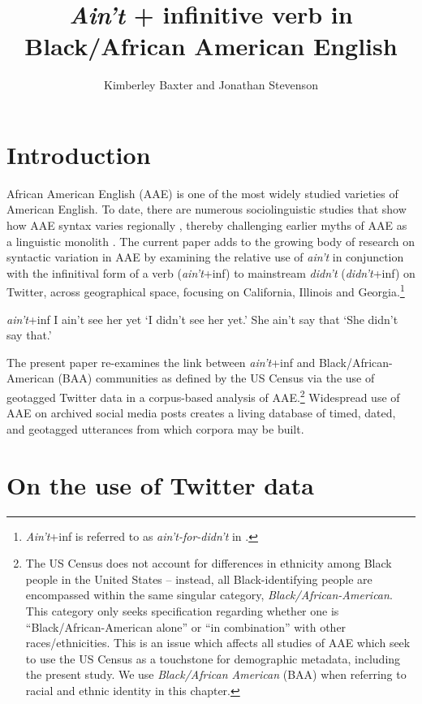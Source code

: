 \documentclass[output=paper,colorlinks,citecolor=brown,draftmode]{langscibook}
\author{Kimberley Baxter\orcid{}\affiliation{New York University} and Jonathan Stevenson\orcid{}\affiliation{University of York}}
\title{{\textit{Ain't}} + infinitive verb in Black/African American English}
\begin{document}
\graphicspath{{figures/baxteretal}}
\maketitle
\label{chap:baxterEtAl}

\section{Introduction}
African American English (AAE) is one of the most widely studied varieties of American English. To date, there are numerous sociolinguistic studies that show how AAE syntax varies regionally \citep{weldon1994,moody2011,kautzsch2012,fisher2022}, thereby challenging earlier myths of AAE as a linguistic monolith \citep{wolfram2007}. The current paper adds to the growing body of research on syntactic variation in AAE by examining the relative use of \textit{ain't} in conjunction with the infinitival form of a verb (\textit{ain't}+inf) to mainstream \textit{didn't} (\textit{didn't}+inf)  on Twitter, across geographical space, focusing on California, Illinois and Georgia.\footnote{\textit{Ain't}+inf is referred to as \textit{ain't-for-didn't} in \citep{fisher2022}.}

\ea \textit{ain't}+inf \label{ex.ai}
\ea I ain’t see her yet
\glt `I didn't see her yet.'
\ex She ain’t say that
\glt `She didn't say that.'
\z
\z

The present paper re-examines the link between \textit{ain't}+inf and Black\slash African\hyp American (BAA) communities as defined by the US Census via the use of geotagged Twitter data in a corpus-based analysis of AAE.\footnote{The US Census does not account for differences in ethnicity among Black people in the United States -- instead, all Black-identifying people are encompassed within the same singular category, \textit{Black\slash African\hyp American}.  This category only seeks specification regarding whether one is “Black\slash African\hyp American alone” or “in combination” with other races/ethnicities.  This is an issue which affects all studies of AAE which seek to use the US Census as a touchstone for demographic metadata, including the present study.  We use \textit{Black/African American} (BAA) when referring to racial and ethnic identity in this chapter.} Widespread use of AAE on archived social media posts creates a living database of timed, dated, and geotagged utterances from which corpora may be built.  

\section{On the use of Twitter data}
\end{document}
